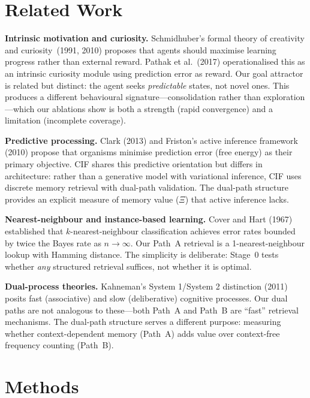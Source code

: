 \documentclass[11pt,a4paper]{article}
\begin{document}
\section{Related Work}

\textbf{Intrinsic motivation and curiosity.} Schmidhuber's formal theory of creativity and curiosity~(1991, 2010) proposes that agents should maximise learning progress rather than external reward. Pathak et al.\ (2017) operationalised this as an intrinsic curiosity module using prediction error as reward. Our goal attractor is related but distinct: the agent seeks \textit{predictable} states, not novel ones. This produces a different behavioural signature---consolidation rather than exploration---which our ablations show is both a strength (rapid convergence) and a limitation (incomplete coverage).

\textbf{Predictive processing.} Clark (2013) and Friston's active inference framework (2010) propose that organisms minimise prediction error (free energy) as their primary objective. CIF shares this predictive orientation but differs in architecture: rather than a generative model with variational inference, CIF uses discrete memory retrieval with dual-path validation. The dual-path structure provides an explicit measure of memory value ($\Xi$) that active inference lacks.

\textbf{Nearest-neighbour and instance-based learning.} Cover and Hart (1967) established that $k$-nearest-neighbour classification achieves error rates bounded by twice the Bayes rate as $n \rightarrow \infty$. Our Path~A retrieval is a 1-nearest-neighbour lookup with Hamming distance. The simplicity is deliberate: Stage~0 tests whether \textit{any} structured retrieval suffices, not whether it is optimal.

\textbf{Dual-process theories.} Kahneman's System 1/System 2 distinction (2011) posits fast (associative) and slow (deliberative) cognitive processes. Our dual paths are not analogous to these---both Path~A and Path~B are ``fast'' retrieval mechanisms. The dual-path structure serves a different purpose: measuring whether context-dependent memory (Path~A) adds value over context-free frequency counting (Path~B).

\section{Methods}
\end{document}
